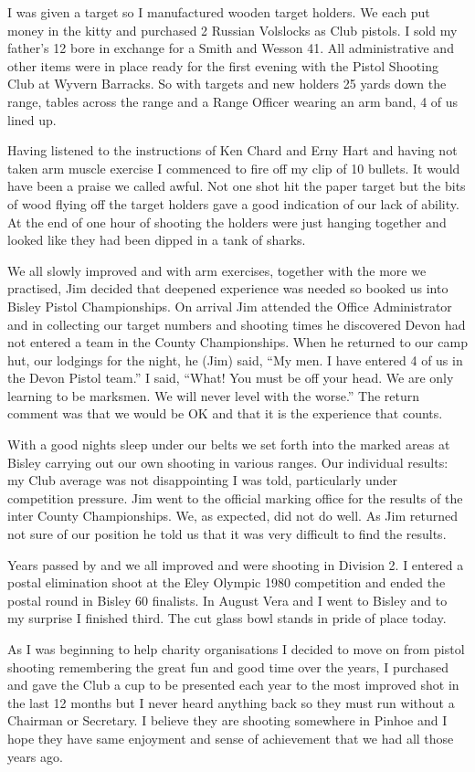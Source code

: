 I was given a target so I manufactured wooden target holders.  We each put money
in the kitty and purchased 2 Russian Volslocks as Club pistols.  I sold my
father's 12 bore in exchange for a Smith and Wesson 41.  All administrative and
other items were in place ready for the first evening with the Pistol Shooting
Club at Wyvern Barracks.  So with targets and new holders 25 yards down the
range, tables across the range and a Range Officer wearing an arm band, 4 of us
lined up.

Having listened to the instructions of Ken Chard and Erny Hart and having not
taken arm muscle exercise I commenced to fire off my clip of 10 bullets.  It
would have been a praise we called awful.  Not one shot hit the paper target
but the bits of wood flying off the target holders gave a good indication of
our lack of ability.  At the end of one hour of shooting the holders were just
hanging together and looked like they had been dipped in a tank of sharks.

We all slowly improved and with arm exercises, together with the more we
practised, Jim decided that deepened experience was needed so booked us into
Bisley Pistol Championships.  On arrival Jim attended the Office Administrator
and in collecting our target numbers and shooting times he discovered Devon had
not entered a team in the County Championships.  When he returned to our camp
hut, our lodgings for the night, he (Jim) said, ``My men.  I have entered 4 of
us in the Devon Pistol team.''  I said, ``What! You must be off your head.  We
are only learning to be marksmen.  We will never level with the worse.''  The
return comment was that we would be OK and that it is the experience that
counts.

With a good nights sleep under our belts we set forth into the marked areas at
Bisley carrying out our own shooting in various ranges.  Our individual
results: my Club average was not disappointing I was told, particularly under
competition pressure.  Jim went to the official marking office for the results
of the inter County Championships.  We, as expected, did not do well.  As Jim
returned not sure of our position he told us that it was very difficult to find
the results.

Years passed by and we all improved and were shooting in Division 2.  I entered
a postal elimination shoot at the Eley Olympic 1980 competition and ended the
postal round in Bisley 60 finalists.  In August Vera and I went to Bisley and
to my surprise I finished third.  The cut glass bowl stands in pride of place
today.

As I was beginning to help charity organisations I decided to move on from
pistol shooting remembering the great fun and good time over the years, I
purchased and gave the Club a cup to be presented each year to the most
improved shot in the last 12 months but I never heard anything back so they
must run without a Chairman or Secretary.  I believe they are shooting
somewhere in Pinhoe and I hope they have same enjoyment and sense of
achievement that we had all those years ago.
